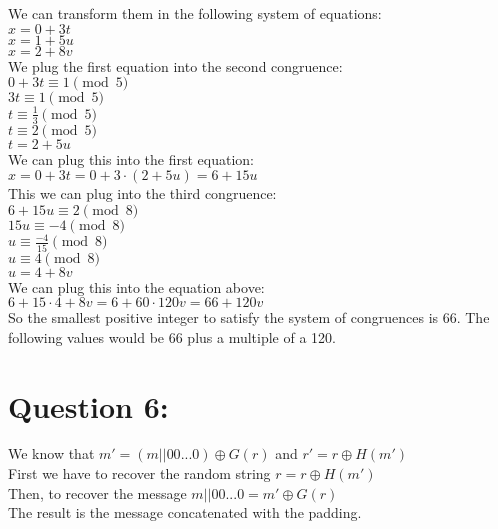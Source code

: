 \documentclass{article}
\begin{document}
\noindent
We can transform them in the following system of equations:
\\
\noindent
$ x = 0 + 3t$ \\
$ x = 1 + 5u$ \\
$ x = 2 + 8v$ \\

\noindent
We plug the first equation into the second congruence:
\\
\noindent
$0 + 3t \equiv 1 \pmod 5$ \\
$3t \equiv 1 \pmod 5$ \\
$t \equiv \frac{1}{3} \pmod 5$ \\
$t \equiv 2 \pmod 5$ \\
$t = 2 + 5u$\\

\noindent
We can plug this into the first equation:
\\
\noindent
$ x = 0 + 3t = 0 + 3 \cdot (2 + 5u) = 6 + 15u $ \\

\noindent
This we can plug into the third congruence:\\
\noindent
$6 + 15u \equiv 2 \pmod 8$ \\
$15u \equiv -4 \pmod 8$ \\
$u \equiv \frac{-4}{15} \pmod 8$ \\
$u \equiv 4 \pmod 8$ \\
$u = 4 + 8v$ \\

\noindent
We can plug this into the equation above: \\

$6 + 15 \cdot 4 + 8v = 6 + 60 \cdot 120v = 66 + 120v$\\

\noindent
So the smallest positive integer to satisfy the system of congruences is 66. The following values would be 66 plus a multiple of a 120.

\section{Question 6:}

We know that $m' = (m || 00...0) \oplus G(r)$ and $r' = r \oplus H(m')$
\\
First we have to recover the random string $r = r \oplus H(m')$
\\
Then, to recover the message $m || 00...0 = m' \oplus G(r)$
\\
The result is the message concatenated with the padding.
\end{document}
